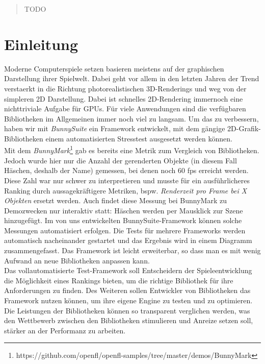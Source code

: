\begin{abstract}
TODO
\end{abstract}

\chapter{Einleitung}
Moderne Computerspiele setzen basieren meistens auf der graphischen Darstellung ihrer Spielwelt. Dabei geht vor allem in den letzten Jahren der Trend  verstaerkt in die Richtung photorealistischen 3D-Renderings und weg von der simpleren 2D Darstellung.
Dabei ist schnelles 2D-Rendering immernoch eine nichttriviale Aufgabe für GPUs. Für viele Anwendungen sind die verfügbaren Bibliotheken im Allgemeinen immer noch viel zu langsam. Um das zu verbessern, haben wir mit \textit{BunnySuite} ein Framework entwickelt, mit dem gängige 2D-Grafik-Bibliotheken einem automatisierten Stresstest ausgesetzt werden können.\\
Mit dem \textit{BunnyMark}\footnote{https://github.com/openfl/openfl-samples/tree/master/demos/BunnyMark} gab es bereits eine Metrik zum Vergleich von Bibliotheken. Jedoch wurde hier nur die Anzahl der gerenderten Objekte (in diesem Fall Häschen, deshalb der Name) gemessen, bei denen noch 60 fps erreicht werden. Diese Zahl war nur schwer zu interpretieren und musste für ein ausführlicheres Ranking durch aussagekräftigere Metriken, bspw. \textit{Renderzeit pro Frame bei X Objekten} ersetzt werden. Auch findet diese Messung bei BunnyMark zu Demozwecken nur interaktiv statt: Häschen werden per Mausklick zur Szene hinzugefügt. Im von uns entwickelten BunnySuite-Framework können solche Messungen automatisiert erfolgen. Die Tests für mehrere Frameworks werden automatisch nacheinander gestartet und das Ergebnis wird in einem Diagramm zusammengefasst. Das Framework ist leicht erweiterbar, so dass man es mit wenig Aufwand an neue Bibliotheken anpassen kann.\\
Das vollautomatisierte Test-Framework soll Entscheidern der Spieleentwicklung die Möglichkeit eines Rankings bieten, um die richtige Bibliothek für ihre Anforderungen zu finden. Des Weiteren sollen Entwickler von Bibliotheken das Framework nutzen können, um ihre eigene Engine zu testen und zu optimieren. Die Leistungen der Bibliotheken können so transparent verglichen werden, was den Wettbewerb zwischen den Bibliotheken stimulieren und Anreize setzen soll, stärker an der Performanz zu arbeiten.

